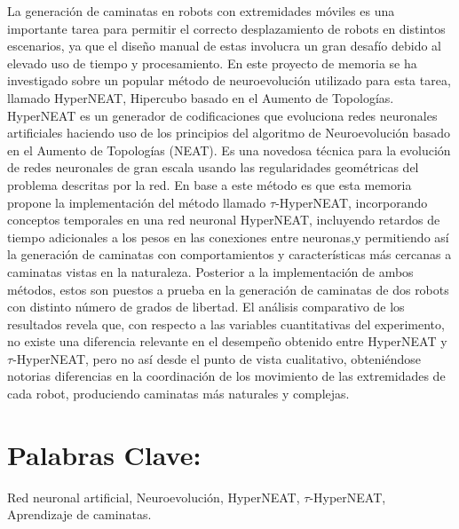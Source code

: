 La generaci\'on de caminatas en robots con extremidades m\'oviles es una importante tarea para permitir el correcto desplazamiento de robots en distintos escenarios, ya que el dise\~no manual de estas involucra un gran desaf\'io debido al elevado uso de tiempo y procesamiento. En este proyecto de memoria se ha investigado sobre un popular m\'etodo de neuroevoluci\'on utilizado para esta tarea, llamado HyperNEAT, Hipercubo basado en el Aumento de Topolog\'ias. HyperNEAT es un generador de codificaciones que evoluciona redes neuronales artificiales haciendo uso de los principios del algoritmo de Neuroevoluci\'on basado en el Aumento de Topolog\'ias (NEAT). Es una novedosa t\'ecnica para la evoluci\'on de redes neuronales de gran escala usando las regularidades geom\'etricas del problema descritas por la red. En base a este m\'etodo es que esta memoria propone la implementaci\'on del m\'etodo llamado \(\tau\)-HyperNEAT, incorporando conceptos temporales en una red neuronal HyperNEAT, incluyendo retardos de tiempo adicionales a los pesos en las conexiones entre neuronas,y permitiendo as\'i la generaci\'on de caminatas con comportamientos y caracter\'isticas m\'as cercanas a caminatas vistas en la naturaleza. Posterior a la implementaci\'on de ambos m\'etodos, estos son puestos a prueba en la generaci\'on de caminatas de dos robots con distinto n\'umero de grados de libertad. El an\'alisis comparativo de los resultados revela que, con respecto a las variables cuantitativas del experimento, no existe una diferencia relevante en el desempe\~no obtenido entre HyperNEAT y \(\tau\)-HyperNEAT, pero no as\'i desde el punto de vista cualitativo, obteni\'endose notorias diferencias en la coordinaci\'on de los movimiento de las extremidades de cada robot, produciendo caminatas m\'as naturales y complejas.

\section*{Palabras Clave:} Red neuronal artificial, Neuroevoluci\'on, HyperNEAT, \(\tau\)-HyperNEAT, Aprendizaje de caminatas.